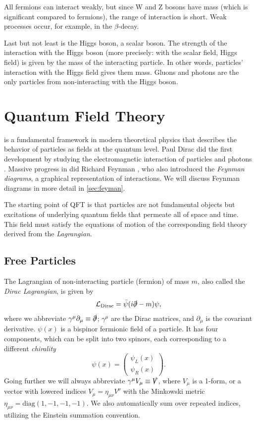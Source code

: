 All fermions can interact weakly, but since W and Z bosons have mass (which is significant compared to fermions), the range of interaction is short.
Weak processes occur, for example, in the $\beta$-decay.

Last but not least is the Higgs boson, a scalar boson.
The strength of the interaction with the Higgs boson (more precisely: with the scalar field, Higgs field) is given by the mass of the interacting particle.
In other words, particles' interaction with the Higgs field gives them mass.
Gluons and photons are the only particles from \SM non-interacting with the Higgs boson.



\section{Quantum Field Theory}
\label{sec:qft}
\QFT is a fundamental framework in modern theoretical physics that describes the behavior of particles as fields at the quantum level.
Paul Dirac did the first development by studying the electromagnetic interaction of particles and photons \cite{dirac}.
Massive progress in \QED did Richard Feynman \cite{feynman}, who also introduced the \emph{Feynman diagrams}, a graphical representation of interactions.
We will discuss Feynman diagrams in more detail in \cref{sec:feyman}.

The starting point of QFT is that particles are not fundamental objects but excitations of underlying quantum fields that permeate all of space and time. 
This field must satisfy the equations of motion of the corresponding field theory derived from the \emph{Lagrangian}.

\subsection{Free Particles}
\label{sec:free_particles}
The Lagrangian of non-interacting \spinhalf particle (fermion) of mass $m$, also called the \emph{Dirac Lagrangian}, is given by
\begin{equation}
    \label{eq:dirac_lag}
    \mathcal{L}_{\text{Dirac}} = \bar{\psi}(i\slashed{\partial} - m) \psi,
\end{equation}
where we abbreviate $\gamma^\mu \partial_\mu \equiv \slashed{\partial}$; $\gamma^\mu$ are the Dirac matrices, and $\partial_\mu$ is the covariant derivative.
$\psi(x)$ is a bispinor fermionic field of a \spinhalf particle. 
It has four components, which can be split into two spinors, each corresponding to a different \emph{chirality}
\begin{equation}
    \psi(x) = \left( \begin{array}{c} \psi_L(x) \\ \psi_R(x) \end{array} \right).
\end{equation}
Going further we will always abbreviate $\gamma^\mu V_\mu \equiv \slashed{V}$, where $V_\mu$ is a 1-form, or a vector with lowered indices $V_\mu = \eta_{\mu \nu} V^\nu$ with the Minkowski metric $\eta_{\mu \nu} = \text{diag}(1,-1,-1,-1)$. 
We also automatically sum over repeated indices, utilizing the Einstein summation convention.


